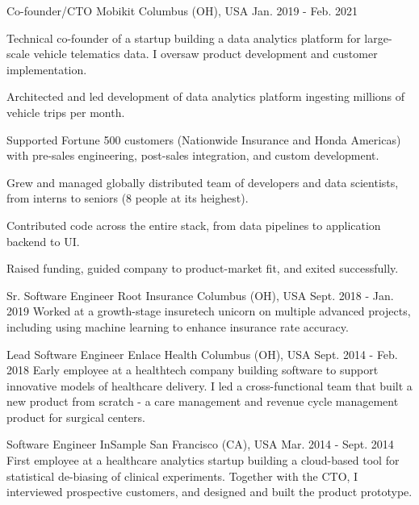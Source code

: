 \begin{cventries}
  \cventry
    {Co-founder/CTO} %
    {Mobikit} %
    {Columbus (OH), USA} %
    {Jan. 2019 - Feb. 2021} %
    {
      Technical co-founder of a startup building a data analytics platform for large-scale vehicle telematics data. I oversaw product development and customer implementation.
      \vspace{5.0mm}
      \begin{cvitems} %
        \item {Architected and led development of data analytics platform ingesting millions of vehicle trips per month.}
        \item {Supported Fortune 500 customers (Nationwide Insurance and Honda Americas) with pre-sales engineering, post-sales integration, and custom development.}
        \item {Grew and managed globally distributed team of developers and data scientists, from interns to seniors (8 people at its heighest).}
        \item {Contributed code across the entire stack, from data pipelines to application backend to UI.}
        \item {Raised funding, guided company to product-market fit, and exited successfully.}
      \end{cvitems}
    }

  \cventry
    {Sr. Software Engineer} %
    {Root Insurance} %
    {Columbus (OH), USA} %
    {Sept. 2018 - Jan. 2019} %
    {
      Worked at a growth-stage insuretech unicorn on multiple advanced projects, including using machine learning to enhance insurance rate accuracy.
      \vspace{3.0mm}
    }

  \cventry
    {Lead Software Engineer} %
    {Enlace Health} %
    {Columbus (OH), USA} %
    {Sept. 2014 - Feb. 2018} %
    {
      Early employee at a healthtech company building software to support innovative models of healthcare delivery. I led a cross-functional team that built a new product from scratch - a care management and revenue cycle management product for surgical centers.
      \vspace{3.0mm}
    }

  \cventry
    {Software Engineer} %
    {InSample} %
    {San Francisco (CA), USA} %
    {Mar. 2014 - Sept. 2014} %
    {
      First employee at a healthcare analytics startup building a cloud-based tool for statistical de-biasing of clinical experiments. Together with the CTO, I interviewed prospective customers, and designed and built the product prototype.
      \vspace{3.0mm}
    }


\end{cventries}
